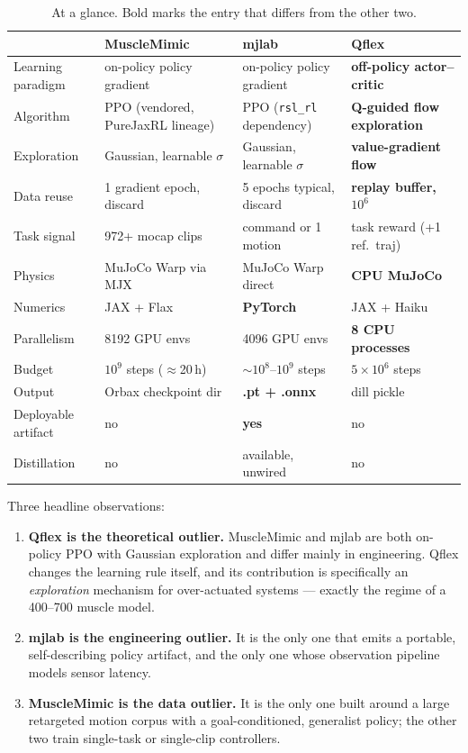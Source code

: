 \documentclass[11pt,a4paper]{article}
\newcommand{\yes}{\textbf{yes}}
\newcommand{\no}{no}
\begin{document}
\begin{table}[h!]
\centering
\footnotesize
\begin{tabular}{@{}lL{3.2cm}L{3.2cm}L{3.5cm}@{}}
\toprule
 & \textcolor{mmC}{\textbf{MuscleMimic}} & \textcolor{mjC}{\textbf{mjlab}} & \textcolor{qfC}{\textbf{Qflex}} \\
\midrule
Learning paradigm & on-policy policy gradient & on-policy policy gradient & \textbf{off-policy actor--critic} \\
Algorithm & PPO (vendored, PureJaxRL lineage) & PPO (\texttt{rsl\_rl} dependency) & \textbf{Q-guided flow exploration} \\
Exploration & Gaussian, learnable $\sigma$ & Gaussian, learnable $\sigma$ & \textbf{value-gradient flow} \\
Data reuse & 1 gradient epoch, discard & 5 epochs typical, discard & \textbf{replay buffer, $10^6$} \\
Task signal & 972+ mocap clips & command or 1 motion & task reward (+1 ref.\ traj) \\
Physics & MuJoCo Warp via MJX & MuJoCo Warp direct & \textbf{CPU MuJoCo} \\
Numerics & JAX + Flax & \textbf{PyTorch} & JAX + Haiku \\
Parallelism & 8192 GPU envs & 4096 GPU envs & \textbf{8 CPU processes} \\
Budget & $10^9$ steps ($\approx$20\,h) & $\sim\!10^8$--$10^9$ steps & $5\times10^6$ steps \\
Output & Orbax checkpoint dir & \textbf{.pt + .onnx} & dill pickle \\
Deployable artifact & \no & \yes & \no \\
Distillation & \no & available, unwired & \no \\
\bottomrule
\end{tabular}
\caption{At a glance. Bold marks the entry that differs from the other two.}
\end{table}

\noindent
Three headline observations:

\begin{enumerate}[leftmargin=1.4em,itemsep=0.35em]
\item \textbf{Qflex is the theoretical outlier.} MuscleMimic and mjlab are both on-policy
PPO with Gaussian exploration and differ mainly in engineering. Qflex changes the learning
rule itself, and its contribution is specifically an \emph{exploration} mechanism for
over-actuated systems --- exactly the regime of a 400--700 muscle model.

\item \textbf{mjlab is the engineering outlier.} It is the only one that emits a portable,
self-describing policy artifact, and the only one whose observation pipeline models
sensor latency.

\item \textbf{MuscleMimic is the data outlier.} It is the only one built around a large
retargeted motion corpus with a goal-conditioned, generalist policy; the other two train
single-task or single-clip controllers.
\end{enumerate}
\end{document}
